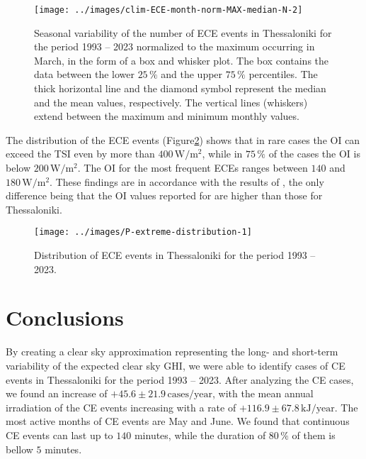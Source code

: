 \documentclass[preprint, 5p,
authoryear]{elsarticle} %
\begin{document}
\begin{figure}

{\centering \texttt{[image: ../images/clim-ECE-month-norm-MAX-median-N-2]} 

}

\caption{Seasonal variability of the number of ECE events in Thessaloniki for the period 1993 -- 2023 normalized to the maximum occurring in March, in the form of a box and whisker plot. The box contains the data between the lower $25\,\%$ and the upper $75\,\%$ percentiles. The thick horizontal line and the diamond symbol represent the median and the mean values, respectively. The vertical lines (whiskers) extend between the maximum and minimum monthly values.}\label{fig:relative-month-occurancies-ECE}
\end{figure}

The distribution of the ECE events
(Figure\nobreakspace{}\ref{fig:P-extreme-distribution}) shows that in
rare cases the OI can exceed the TSI even by more than
\(400\,\text{W}/\text{m}^2\), while in \(75\,\%\) of the cases the OI is
below \(200\,\text{W}/\text{m}^2\). The OI for the most frequent ECEs
ranges between \(140\) and \(180\,\text{W}/\text{m}^2\). These findings
are in accordance with the results of \citet{Vamvakas2020}, the only
difference being that the OI values reported for are higher than those
for Thessaloniki.

\begin{figure}

{\centering \texttt{[image: ../images/P-extreme-distribution-1]} 

}

\caption{Distribution of ECE events in Thessaloniki for the period 1993 -- 2023.}\label{fig:P-extreme-distribution}
\end{figure}

\hypertarget{conclusions}{%
\section{Conclusions}\label{conclusions}}

By creating a clear sky approximation representing the long- and
short-term variability of the expected clear sky GHI, we were able to
identify cases of CE events in Thessaloniki for the period 1993 -- 2023.
After analyzing the CE cases, we found an increase of
\(+45.6\pm 21.9\,\text{cases}/\text{year}\), with the mean annual
irradiation of the CE events increasing with a rate of
\(+116.9\pm 67.8\,\text{kJ}/\text{year}\). The most active months of CE
events are May and June. We found that continuous CE events can last up
to \(140\) minutes, while the duration of \(80\,\%\) of them is bellow
\(5\) minutes.
\end{document}
